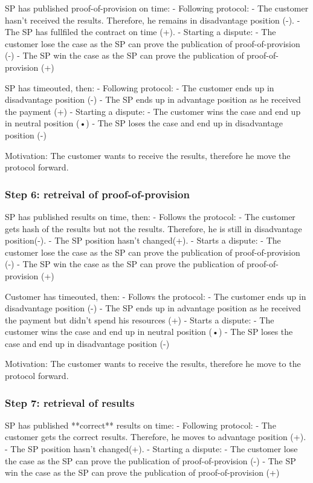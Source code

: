 \documentclass{article}
\begin{document}
SP has published proof-of-provision on time:
- Following protocol:
	- The customer hasn't received the results. Therefore, he remains in disadvantage position (-).
	- The SP has fullfiled the contract on time (+).
- Starting a dispute:
	- The customer lose the case as the SP can prove the publication of proof-of-provision (-)
	- The SP win the case as the SP can prove the publication of proof-of-provision (+)

SP has timeouted, then:
- Following protocol:
	- The customer ends up in disadvantage position (-)
	- The SP ends up in advantage position as he received the payment (+)
- Starting a dispute:
	- The customer wins the case and end up in neutral position (•)
	- The SP loses the case and end up in disadvantage position (-)


Motivation:
The customer wants to receive the results, therefore he move the protocol forward.

\subsubsection{Step 6: retreival of proof-of-provision}

SP has published results on time, then:
- Follows the protocol:
	- The customer gets hash of the results but not the results. Therefore, he is still in disadvantage position(-).
	- The SP position hasn't changed(+).
- Starts a dispute:
	- The customer lose the case as the SP can prove the publication of proof-of-provision (-)
	- The SP win the case as the SP can prove the publication of proof-of-provision (+)

Customer has timeouted, then:
- Follows the protocol:
	- The customer ends up in disadvantage position (-)
	- The SP ends up in advantage position as he received the payment but didn't spend his resources (+)
- Starts a dispute:
	- The customer wins the case and end up in neutral position (•)
	- The SP loses the case and end up in disadvantage position (-)


Motivation:
The customer wants to receive the results, therefore he move to the protocol forward.

\subsubsection{Step 7: retrieval of results}

SP has published **correct** results on time:
- Following protocol:
	- The customer gets the correct results. Therefore, he moves to advantage position (+).
	- The SP position hasn't changed(+).
- Starting a dispute:
	- The customer lose the case as the SP can prove the publication of proof-of-provision (-)
	- The SP win the case as the SP can prove the publication of proof-of-provision (+)
\end{document}
